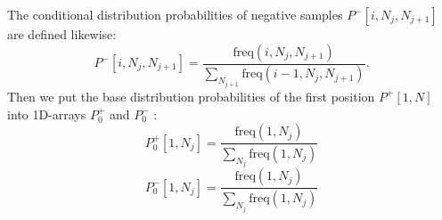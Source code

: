 \documentclass[journal,twoside]{IEEEtran}
\begin{document}
The conditional distribution probabilities of negative samples $P^-[i, N_j, N_{j+1}]$ are defined likewise: 
\begin{equation}
P^-[i, N_j, N_{j+1}] = \displaystyle\frac{\text{freq}(i, N_j, N_{j+1})}{\sum\limits_{N_{j+1}}\text{freq}(i-1, N_j, N_{j+1})}.
\label{eq2}
\end{equation}
Then we put the base distribution probabilities of the first position $P^+[1, N]$ into 1D-arrays $P_0^+$ and $P_0^-$ : 
\begin{equation}
P_0^+[1, N_j] = \displaystyle\frac{\text{freq}(1, N_j)}{\sum\limits_{N_{j}}\text{freq}(1, N_j)}
\label{eq3}
\end{equation}
\begin{equation}
P_0^-[1, N_j] = \displaystyle\frac{\text{freq}(1, N_j)}{\sum\limits_{N_{j}}\text{freq}(1, N_j)}
\label{eq4}
\end{equation}
\end{document}
